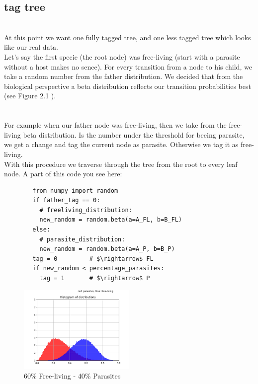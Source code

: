     \subsection{tag tree}
       \\
      At this point we want one fully tagged tree, and one less tagged tree which looks like our real 
        data.\\
      Let's say the first specie (the root node) was free-living (start with a parasite without a host 
        makes no sence). For every transition from a node to his child, we take a random number from
        the father distribution. We decided that from the biological perspective a beta distribution
        reflects our transition probabilities best (see Figure 2.1 ). \\
       \\
       \\
      For example when our father node was free-living, then we take from the free-living beta
        distribution. Is the number under the threshold for beeing parasite, we get a change and tag
        the current node as parasite. Otherwise we tag it as free-living. \\
      With this procedure we traverse through the tree from the root to every leaf node. A part of
        this code you see here:
      \begin{lstlisting}
        from numpy import random
        if father_tag == 0:
          # freeliving_distribution:
          new_random = random.beta(a=A_FL, b=B_FL)
        else:
          # parasite_distribution:
          new_random = random.beta(a=A_P, b=B_P)
        tag = 0         # $\rightarrow$ FL
        if new_random < percentage_parasites:
          tag = 1       # $\rightarrow$ P
      \end{lstlisting}
      \begin{figure}
        \caption{60\% Free-living - 40\% Parasites}
        \centering
          \includegraphics[width=0.5\textwidth]{Figures/40-60.png}
      \end{figure}
